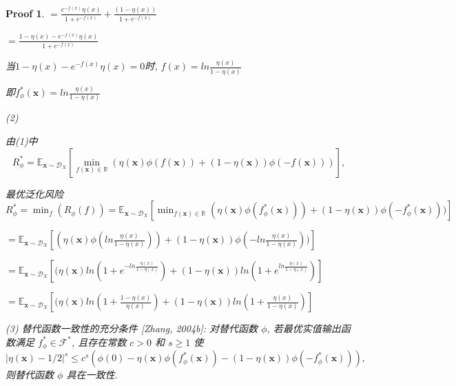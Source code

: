 \documentclass[a4paper,UTF8]{article}
\numberwithin{equation}{section}
\newtheorem*{myProof}{Proof}
\begin{document}
\begin{myProof}
		$=\frac{e^{-f(x)}\eta(x)}{1+e^{-f(x)}} + \frac{(1-\eta(x))}{1+e^{-f(x)}}$
		
		$=\frac{1-\eta(x)-e^{-f(x)}\eta(x)}{1+e^{-f(x)}}$
		
		当$1-\eta(x)-e^{-f(x)}\eta(x)=0$时, $f(x) = ln\frac{\eta(x)}{1-\eta(x)}$
		
		即$f_{\phi}^{*}(\boldsymbol{x})  = ln\frac{\eta(x)}{1-\eta(x)}$
		
		(2)
		
		由(1)中
		$$
		R_{\phi}^{*}=\mathbb{E}_{\boldsymbol{x} \sim \mathcal{D}_{X}}\left[\min _{f(\boldsymbol{x}) \in \mathbb{R}}(\eta(\boldsymbol{x}) \phi(f(\boldsymbol{x}))+(1-\eta(\boldsymbol{x})) \phi(-f(\boldsymbol{x})))\right],
		$$
		
		最优泛化风险$R_{\phi}^{*}=\min _{f}\left(R_{\phi}(f)\right) = \mathbb{E}_{\boldsymbol{x} \sim \mathcal{D}_{X}}\left[\min _{f(\boldsymbol{x}) \in \mathbb{R}}(\eta(\boldsymbol{x}) \phi(f_{\phi}^{*}(\boldsymbol{x})))+(1-\eta(\boldsymbol{x})) \phi(-f_{\phi}^{*}(\boldsymbol{x})))\right]$
		
		$=\mathbb{E}_{\boldsymbol{x} \sim \mathcal{D}_{X}}\left[(\eta(\boldsymbol{x}) \phi(ln\frac{\eta(x)}{1-\eta(x)}))+(1-\eta(\boldsymbol{x})) \phi(-ln\frac{\eta(x)}{1-\eta(x)}))\right]$
		
		$=\mathbb{E}_{\boldsymbol{x} \sim \mathcal{D}_{X}}\left[(\eta(\boldsymbol{x}) ln(1+e^{-ln\frac{\eta(x)}{1-\eta(x)}})+(1-\eta(\boldsymbol{x})) ln(1+e^{ln\frac{\eta(x)}{1-\eta(x)}})\right]
		$
		
		$=\mathbb{E}_{\boldsymbol{x} \sim \mathcal{D}_{X}}\left[(\eta(\boldsymbol{x}) ln(1+\frac{1-\eta(x)}{\eta(x)})+(1-\eta(\boldsymbol{x})) ln(1+\frac{\eta(x)}{1-\eta(x)})\right]$
		
		(3)
		替代函数一致性的充分条件 [Zhang, 2004b]:
		对替代函数 $\phi$, 若最优实值输出函数满足 $f_{\phi}^{*} \in \mathcal{F}^{*}$, 且存在常数 $c>0$ 和 $s \geqslant 1$ 使
		$$
		|\eta(\boldsymbol{x})-1 / 2|^{s} \leqslant c^{s}\left(\phi(0)-\eta(\boldsymbol{x}) \phi\left(f_{\phi}^{*}(\boldsymbol{x})\right)-(1-\eta(\boldsymbol{x})) \phi\left(-f_{\phi}^{*}(\boldsymbol{x})\right)\right),
		$$
		则替代函数 $\phi$ 具在一致性.
		

\end{myProof}
\end{document}
